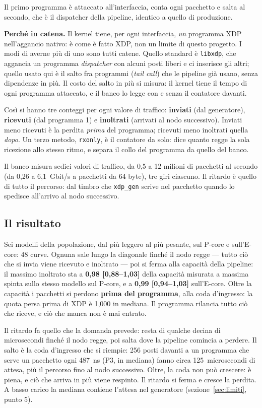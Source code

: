 \documentclass[11pt,a4paper,oneside]{report}
\begin{document}
Il primo programma è attaccato all'interfaccia, conta ogni pacchetto e salta al
secondo, che è il dispatcher della pipeline, identico a quello di produzione.

\textbf{Perché in catena.} Il kernel tiene, per ogni interfaccia, \emph{un}
programma XDP nell'aggancio nativo: è come è fatto XDP, non un limite di questo
progetto. I modi di averne più di uno sono tutti catene. Quello standard è
\texttt{libxdp}, che aggancia un programma \emph{dispatcher} con alcuni posti
liberi e ci inserisce gli altri; quello usato qui è il salto fra programmi
(\emph{tail call}) che le pipeline già usano, senza dipendenze in più. Il costo
del salto in più si misura: il kernel tiene il tempo di ogni programma attaccato,
e il banco lo legge con e senza il contatore davanti.

Così si hanno tre conteggi per ogni valore di traffico: \textbf{inviati} (dal
generatore), \textbf{ricevuti} (dal programma 1) e \textbf{inoltrati} (arrivati
al nodo successivo). Inviati meno ricevuti è la perdita \emph{prima} del
programma; ricevuti meno inoltrati quella \emph{dopo}. Un terzo metodo,
\texttt{rxonly}, è il contatore da solo: dice quanto regge la sola ricezione allo
stesso ritmo, e separa il collo del programma da quello del banco.

Il banco misura sedici valori di traffico, da 0,5 a 12 milioni di pacchetti al
secondo (da 0,26 a 6,1~Gbit/s a pacchetti da 64 byte), tre giri ciascuno. Il
ritardo è quello di tutto il percorso: dal timbro che \texttt{xdp\_gen} scrive nel
pacchetto quando lo spedisce all'arrivo al nodo successivo.

\subsection*{Il risultato}

Sei modelli della popolazione, dal più leggero al più pesante, sul P-core e
sull'E-core: 48 curve. Ognuna sale lungo la diagonale finché il nodo regge ---
tutto ciò che si invia viene ricevuto e inoltrato --- poi si ferma alla capacità
della pipeline: il massimo inoltrato sta a \textbf{0,98 [0,88--1,03]} della
capacità misurata a massima spinta sullo stesso modello sul P-core, e a
\textbf{0,99 [0,94--1,03]} sull'E-core. Oltre la capacità i pacchetti si perdono
\textbf{prima del programma}, alla coda d'ingresso: la quota persa prima di XDP
è 1,000 in mediana. Il programma rilancia tutto ciò che riceve, e ciò che manca
non è mai entrato.

Il ritardo fa quello che la domanda prevede: resta di qualche decina di
microsecondi finché il nodo regge, poi salta dove la pipeline comincia a
perdere. Il salto è la coda d'ingresso che si riempie: 256 posti davanti a un
programma che serve un pacchetto ogni 487~ns (P3, in mediana) fanno circa
125~microsecondi di attesa, più il percorso fino al nodo successivo. Oltre, la
coda non può crescere: è piena, e ciò che arriva in più viene respinto. Il
ritardo si ferma e cresce la perdita. A basso carico la mediana contiene
l'attesa nel generatore (sezione~\ref{sec:limiti}, punto 5).
\end{document}
